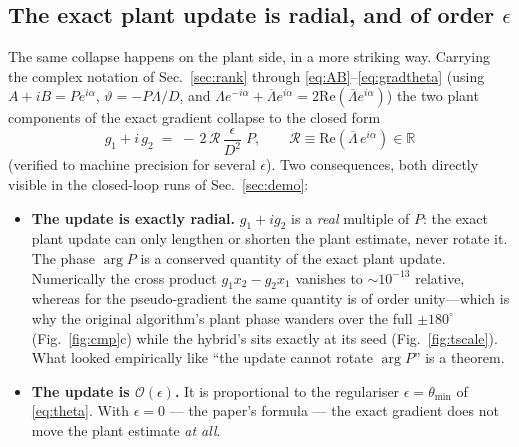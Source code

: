 \documentclass[11pt]{article}
\begin{document}
\subsection{The exact plant update is radial, and of order $\epsilon$}
\label{sec:radial}

The same collapse happens on the plant side, in a more striking way.
Carrying the complex notation of Sec.~\ref{sec:rank} through
\eqref{eq:AB}--\eqref{eq:gradtheta} (using $A+iB=Pe^{i\alpha}$,
$\vartheta=-P\Lambda/D$, and $\Lambda e^{-i\alpha}+\overline{\Lambda}e^{i\alpha}=2\mathrm{Re}(\overline{\Lambda}e^{i\alpha})$)
the two plant components of the exact gradient collapse to the closed form
\begin{equation}
  \boxed{\;g_1+i\,g_2 \;=\; -\,2\,\mathcal{R}\,\frac{\epsilon}{D^{2}}\;P,
  \qquad \mathcal{R}\equiv\mathrm{Re}\!\left(\overline{\Lambda}\,e^{i\alpha}\right)\in\mathbb{R}\;}
  \label{eq:gplant}
\end{equation}
(verified to machine precision for several $\epsilon$). Two consequences,
both directly visible in the closed-loop runs of Sec.~\ref{sec:demo}:

\begin{itemize}\itemsep2pt
  \item \textbf{The update is exactly radial.} $g_1+ig_2$ is a
    \emph{real} multiple of $P$: the exact plant update can only lengthen
    or shorten the plant estimate, never rotate it. The phase $\arg P$ is a
    conserved quantity of the exact plant update. Numerically the cross
    product $g_1x_2-g_2x_1$ vanishes to $\sim\!10^{-13}$ relative, whereas
    for the pseudo-gradient the same quantity is of order unity---which is
    why the original algorithm's plant phase wanders over the full
    $\pm180^\circ$ (Fig.~\ref{fig:cmp}c) while the hybrid's sits exactly at
    its seed (Fig.~\ref{fig:tscale}). What looked empirically like ``the
    update cannot rotate $\arg P$'' is a theorem.
  \item \textbf{The update is $\mathcal{O}(\epsilon)$.} It is proportional
    to the regulariser $\epsilon=\theta_{\min}$ of \eqref{eq:theta}. With
    $\epsilon=0$ --- the paper's formula --- the exact gradient does not
    move the plant estimate \emph{at all}.
\end{itemize}
\end{document}

